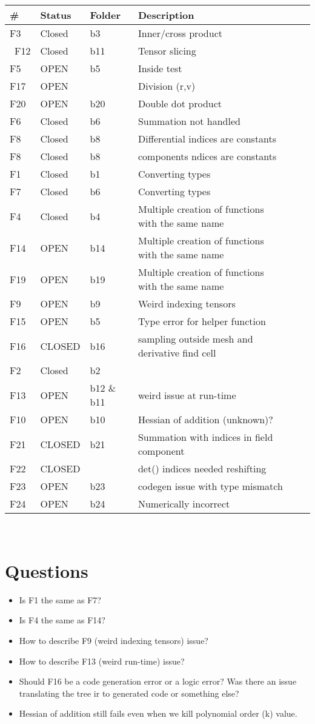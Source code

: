 \documentclass{article}
\begin{document}
\begin{tabular}{|l|ll|lll|}
\hline
\# & Status & Folder & Description \\
\hline
 F3 &Closed&b3  & Inner/cross product  \\\
  F12 &Closed & b11 & Tensor slicing\\
   F5 &OPEN&b5& Inside test\\
F17 &OPEN &   & Division (r,v)\\
  F20 &OPEN & b20  & Double dot product\\
 F6 &Closed &b6  & Summation not handled \\
  F8 &Closed &b8 &Differential indices are constants\\
    F8 &Closed &b8 &components ndices are constants\\
 F1 &Closed& b1& Converting types\\
F7 &Closed& b6  & Converting types\\
 F4 &Closed&b4 &Multiple creation of functions with the same name \\
F14 &OPEN & b14 &Multiple creation of functions with the same name\\
F19 &OPEN & b19 &Multiple creation of functions with the same name\\
   F9 &OPEN&b9 & Weird indexing tensors\\
 F15 &OPEN&b5 & Type error for helper function\\
  F16 &CLOSED & b16  & sampling outside mesh and derivative find cell  \\
 F2 &Closed &b2  &\\
  F13 &OPEN & b12 \& b11  &weird issue at run-time\\
 F10 &OPEN &b10 &  Hessian of addition (unknown)?\\
 F21  &CLOSED&b21 &Summation with indices in field component\\
  F22  &CLOSED& & det() indices needed reshifting\\
  F23  &OPEN& b23& codegen issue with type mismatch\\
F24  &OPEN& b24& Numerically incorrect\\
\hline
\end{tabular}
\\


\section{Questions}
\begin{itemize}[noitemsep]
\item Is F1 the same as F7?
\item  Is F4 the same as F14?  
\item How to describe F9 (weird indexing tensors) issue?
\item How to describe F13 (weird run-time) issue?
\item Should F16 be a code generation error or a logic error? Was there an issue translating the tree ir to generated code or something else?
\item Hessian of addition still fails even when we kill polynomial order (k) value.
\end{itemize}




\end{document}
